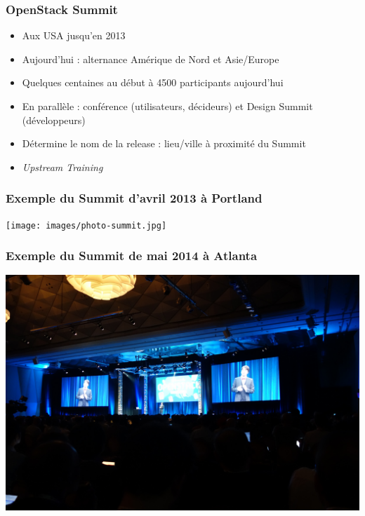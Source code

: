   \begin{frame}
    \frametitle{OpenStack Summit}
    \begin{itemize}
      \item Aux USA jusqu'en 2013
      \item Aujourd'hui : alternance Amérique de Nord et Asie/Europe
      \item Quelques centaines au début à 4500 participants aujourd'hui
      \item En parallèle : conférence (utilisateurs, décideurs) et Design Summit (développeurs)
      \item Détermine le nom de la release : lieu/ville à proximité du Summit
      \item \textit{Upstream Training}
    \end{itemize}
  \end{frame}

  \begin{frame}
    \frametitle{Exemple du Summit d'avril 2013 à Portland}
    \texttt{[image: images/photo-summit.jpg]}
  \end{frame}

  \begin{frame}
    \frametitle{Exemple du Summit de mai 2014 à Atlanta}
    \includegraphics[width=\textwidth]{images/photo-summit1.jpg}
  \end{frame}

